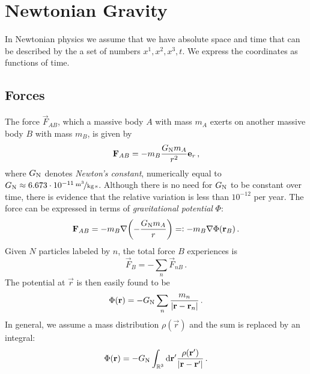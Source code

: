 \chapter{Newtonian Gravity}
In Newtonian physics we assume that we have absolute space and time that can be described by the a set of numbers $x^1,x^2,x^3,t$.
We express the coordinates as functions of time.
\section{Forces}
The force $\vec{F}_{AB}$, which a massive body $A$ with mass $m_A$ exerts on another massive body $B$ with mass $m_B$, is given by
\begin{equation}
    \vec{F}_{AB}=-m_B\frac{G\textsubscript{N}m_A}{r^2}\vec{e}_r\, ,
\end{equation}
where $G\textsubscript{N}$ denotes \emph{Newton's constant}, numerically equal
to $G\textsubscript{N}\approx \unitfrac[6.673\cdot 10^{-11}]{m^3}{kg\,s}$.
Although there is no need for $G\textsubscript{N}$ to be constant over time,
there is evidence that the relative variation is less than $10^{-12}$ per year.
The force can be expressed in terms of \emph{gravitational potential} $\Phi$:
\begin{equation}
    \vec{F}_{AB}=-m_B\nabla\left(-\frac{G\textsubscript{N}m_A}{r}\right)=:
    -m_B\nabla\Phi(\vec{r}_B)\, .
\end{equation}
Given $N$ particles labeled by $n$, the total force $B$ experiences is
\begin{equation}
    \vec{F}_{B}=-\sum_n \vec{F}_{nB}\, .
\end{equation}
The potential at $\vec{r}$ is then easily found to be
\begin{equation}
    \Phi(\vec{r})=-G\textsubscript{N}\sum_n\frac{m_n}{|\vec{r}-\vec{r}_n|}\, .
\end{equation}
In general, we assume a mass distribution $\rho(\vec{r})$ and the sum is
replaced by an integral:
\begin{equation}
    \Phi(\vec{r}) = -G\textsubscript{N}\int_{\Reals^3}\dif{\vec{r}^{\prime}}
    \frac{\rho(\vec{r}^{\prime})}{|\vec{r}-\vec{r}^{\prime}|}\,.
\end{equation}
